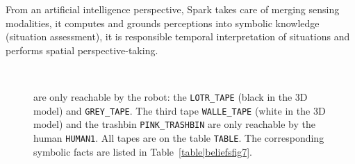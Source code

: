 \documentclass[preprint,3p,times]{elsarticle}
\newcommand{\concept}[1]{{\small \texttt{#1}}}
\begin{document}
From an artificial intelligence perspective, {\sc Spark} takes care of merging
sensing modalities, it computes and grounds perceptions into symbolic
knowledge (situation assessment), it is responsible temporal interpretation of
situations and performs spatial perspective-taking.

\begin{figure}[ht!]
   \begin{center}
%
       \\ %
%
   \end{center}

   \caption{%
       are only reachable by the robot: the \concept{LOTR\_TAPE} (black in the 3D
       model) and \concept{GREY\_TAPE}. The third tape \concept{WALLE\_TAPE} (white
       in the 3D model) and the trashbin \concept{PINK\_TRASHBIN} are only
       reachable by the human \concept{HUMAN1}. All tapes are on the table
   \concept{TABLE}. The corresponding symbolic facts are listed in Table~\ref{table|beliefsfig7}.  }%
 
 \label{fig:sparkSubfigures}

\end{figure}
\end{document}
